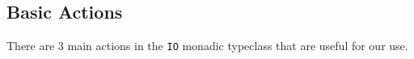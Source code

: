 \subsection{Basic \texorpdfstring{}{\texttt{IO}} Actions}\label{subsec:Basic_IO_Actions}
There are 3 main actions in the \texttt{IO} monadic typeclass that are useful for our use.
\begin{nocrefenumerate}
\item {}\label{act:IO_getChar}
\item {}\label{act:IO_putChar}
\item {}\label{act:IO_return}
\end{nocrefenumerate}


